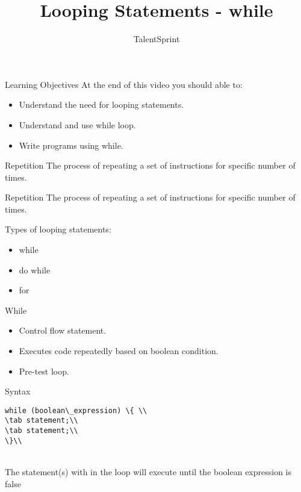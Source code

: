 \documentclass[aspectratio=169,14pt,usenames,dvipsnames]{beamer}
\title[Looping Statements - while]{Looping Statements - while}
\newcommand\tab[1][1cm]{\hspace*{#1}}
\begin{document}
{\1
\begin{frame} \vspace{35pt}

\subtitle{TalentSprint}
\maketitle
\end{frame}
}


\begin{frame}{Learning Objectives}
At the end of this video you should able to:
\begin{itemize}
\item Understand the need for looping
statements.
\item Understand and use while loop.
\item Write programs using while.
\end{itemize}
\end{frame}


\begin{frame}{Repetition}
The process of repeating a set of instructions
for specific number of times.
\end{frame}

\begin{frame}{Repetition}
The process of repeating a set of instructions
for specific number of times.
\begin{block}{Types of looping statements:}
\begin{itemize}
    \item while
    \item do while
    \item for 
\end{itemize}
\end{block}
\end{frame}

\begin{frame}{While}
\begin{itemize}
    \item Control flow statement.
    \item Executes code repeatedly based on boolean
condition.
    \item Pre-test loop.
\end{itemize}
\end{frame}

\begin{frame}{Syntax}
\begin{lstlisting}
while (boolean\_expression) \{ \\
\tab statement;\\
\tab statement;\\
\}\\
\end{lstlisting}\\
The statement(s) with in the loop will execute
until the boolean expression is false
\end{frame}
\end{document}
